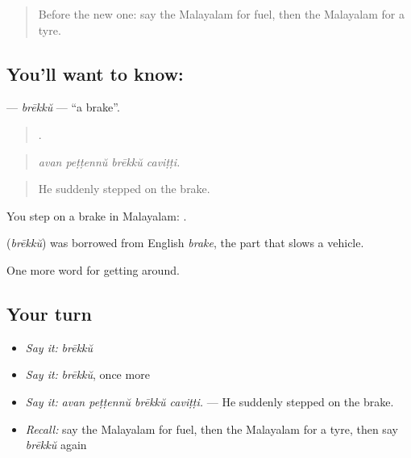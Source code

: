 \label{lesson:ML-C470-brekku}



\begin{quote}
Before the new one: say the Malayalam for fuel, then the Malayalam for a tyre.
\end{quote}

\subsection*{You'll want to know: }
\textbf{} — \emph{brēkkŭ} — \textquotedblleft{}a brake\textquotedblright{}.

\begin{quote}
   .
\end{quote}

\begin{quote}
\emph{avan peṭṭennŭ brēkkŭ caviṭṭi.}
\end{quote}

\begin{quote}
He suddenly stepped on the brake.
\end{quote}

You step on a brake in Malayalam:  .

\begin{cousinweb}
\textbf{} (\emph{brēkkŭ}) was borrowed from English \emph{brake}, the part that slows a vehicle.
\end{cousinweb}

\begin{grammarlens}[title={What you've built}]
One more word for getting around.
\end{grammarlens}

\subsection*{Your turn}
\begin{itemize}
\raggedright
  \item \emph{Say it:} \emph{brēkkŭ}
  \item \emph{Say it:} \emph{brēkkŭ}, once more
  \item \emph{Say it:} \emph{avan peṭṭennŭ brēkkŭ caviṭṭi.} — He suddenly stepped on the brake.
  \item \emph{Recall:} say the Malayalam for fuel, then the Malayalam for a tyre, then say \emph{brēkkŭ} again
\end{itemize}


